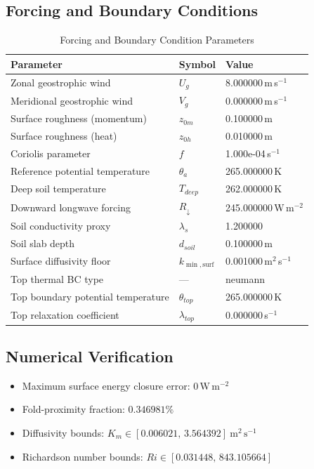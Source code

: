 \subsection{Forcing and Boundary Conditions}
\begin{table}[htbp]
\centering
\caption{Forcing and Boundary Condition Parameters}
\label{tab:scm_parameters_gabls1_400m_gabls1_200x2m_12h_report}
\begin{tabular}{lll}
\hline
{\bfseries Parameter} & {\bfseries Symbol} & {\bfseries Value} \\
\hline
Zonal geostrophic wind & $U_g$ & 8.000000\,m\,s$^{-1}$ \\
Meridional geostrophic wind & $V_g$ & 0.000000\,m\,s$^{-1}$ \\
Surface roughness (momentum) & $z_{0m}$ & 0.100000\,m \\
Surface roughness (heat) & $z_{0h}$ & 0.010000\,m \\
Coriolis parameter & $f$ & 1.000e-04\,s$^{-1}$ \\
Reference potential temperature & $\theta_a$ & 265.000000\,K \\
Deep soil temperature & $T_{deep}$ & 262.000000\,K \\
Downward longwave forcing & $R_{\downarrow}$ & 245.000000\,W\,m$^{-2}$ \\
Soil conductivity proxy & $\lambda_s$ & 1.200000 \\
Soil slab depth & $d_{soil}$ & 0.100000\,m \\
Surface diffusivity floor & $k_{\min,\mathrm{surf}}$ & 0.001000\,m$^2$\,s$^{-1}$ \\
Top thermal BC type & --- & neumann \\
Top boundary potential temperature & $\theta_{top}$ & 265.000000\,K \\
Top relaxation coefficient & $\lambda_{top}$ & 0.000000\,s$^{-1}$ \\
\hline
\end{tabular}
\end{table}

\subsection{Numerical Verification}
\begin{itemize}
  \item Maximum surface energy closure error:
  $0\,\mathrm{W\,m^{-2}}$
  \item Fold-proximity fraction:
  $0.346981\%$
  \item Diffusivity bounds:
  $K_m \in [0.006021,\,3.564392]~\mathrm{m^2\,s^{-1}}$
  \item Richardson number bounds:
  $Ri \in [0.031448,\,843.105664]$
\end{itemize}

